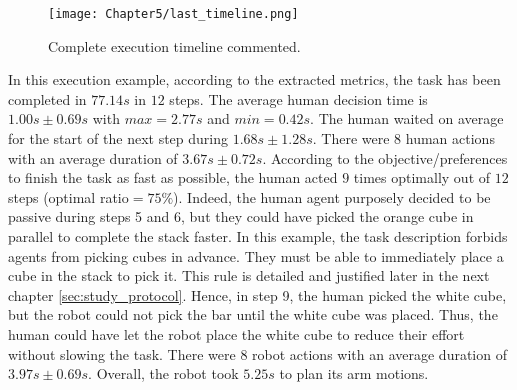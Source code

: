 \begin{figure}
    \centering
    \texttt{[image: Chapter5/last\_timeline.png]}
    \caption{Complete execution timeline commented.}
    \label{fig:timeline_example}
\end{figure}

In this execution example, according to the extracted metrics, the task has been completed in $77.14s$ in $12$ steps. The average human decision time is $1.00s \pm 0.69s$ with $max=2.77s$ and $min=0.42s$. The human waited on average for the start of the next step during $1.68s \pm 1.28s$. There were $8$ human actions with an average duration of $3.67s \pm 0.72s$. According to the objective/preferences to finish the task as fast as possible, the human acted $9$ times optimally out of $12$ steps (optimal ratio$=75\%$). Indeed, the human agent purposely decided to be passive during steps 5 and 6, but they could have picked the orange cube in parallel to complete the stack faster. In this example, the task description forbids agents from picking cubes in advance. They must be able to immediately place a cube in the stack to pick it. This rule is detailed and justified later in the next chapter \ref{sec:study_protocol}. Hence, in step 9, the human picked the white cube, but the robot could not pick the bar until the white cube was placed. Thus, the human could have let the robot place the white cube to reduce their effort without slowing the task.
There were $8$ robot actions with an average duration of $3.97s \pm 0.69s$. Overall, the robot took $5.25s$ to plan its arm motions. 


